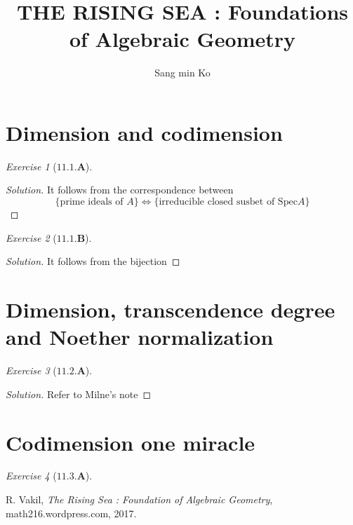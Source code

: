 \documentclass{jams-l}
\theoremstyle{definition}
\theoremstyle{remark}
\theoremstyle{corollary}
\theoremstyle{claim}
\newtheorem*{xca*}{Exercise}
\newenvironment{solution}
{\begin{proof}[Solution]}
{\end{proof}}
\newenvironment{exercise}[1]
{\begin{xca*}[$\mathbf{#1}$] %
}
{\end{xca*}}
\numberwithin{equation}{section}
\newcommand{\Spec}{\mathrm{Spec}}
\begin{document}
\title{THE RISING SEA : Foundations of Algebraic Geometry}

\author{Sang min Ko}
\address{Department of Mathematics, Columbia University}



\maketitle


\section{Dimension and codimension}
\begin{exercise}{11.1.A} 
\end{exercise}
\begin{solution}
It follows from the correspondence between
\[ \{ \text{prime ideals of }A \} \Longleftrightarrow \{ \text{irreducible closed susbet of } \Spec A\} \] 
\end{solution}

\begin{exercise}{11.1.B}
\end{exercise}
\begin{solution}
It follows from the bijection
\end{solution}


\section{Dimension, transcendence degree and Noether normalization}
\begin{exercise}{11.2.A}
\end{exercise}
\begin{solution}
Refer to Milne's note
\end{solution}



\section{Codimension one miracle}
\begin{exercise}{11.3.A}

\end{exercise}





\begin{thebibliography}{10}

 R. Vakil, \textit{The Rising Sea : Foundation of Algebraic Geometry}, math216.wordpress.com, 2017.

\end{thebibliography}
\end{document}
